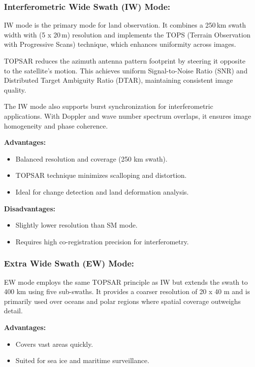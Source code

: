 \subsubsection{\textbf{Interferometric Wide Swath (IW) Mode:}}

IW mode is the primary mode for land observation. It combines a 250 km swath width with (5 x 20 m) resolution and implements the TOPS (Terrain Observation with Progressive Scans) technique, which enhances uniformity across images.

TOPSAR reduces the azimuth antenna pattern footprint by steering it opposite to the satellite’s motion. This achieves uniform Signal-to-Noise Ratio (SNR) and Distributed Target Ambiguity Ratio (DTAR), maintaining consistent image quality.

The IW mode also supports burst synchronization for interferometric applications. With Doppler and wave number spectrum overlaps, it ensures image homogeneity and phase coherence.


\textbf{Advantages:}
\begin{itemize}
    \item Balanced resolution and coverage (250 km swath).
    \item TOPSAR technique minimizes scalloping and distortion.
    \item Ideal for change detection and land deformation analysis.
\end{itemize}

\textbf{Disadvantages:}
\begin{itemize}
    \item Slightly lower resolution than SM mode.
    \item Requires high co-registration precision for interferometry.
\end{itemize}

\subsubsection{\textbf{Extra Wide Swath (EW) Mode:} }

EW mode employs the same TOPSAR principle as IW but extends the swath to 400 km using five sub-swaths. It provides a coarser resolution of 20 x 40 m and is primarily used over oceans and polar regions where spatial coverage outweighs detail.


\textbf{Advantages:}
\begin{itemize}
    \item Covers vast areas quickly.
    \item Suited for sea ice and maritime surveillance.
\end{itemize}

